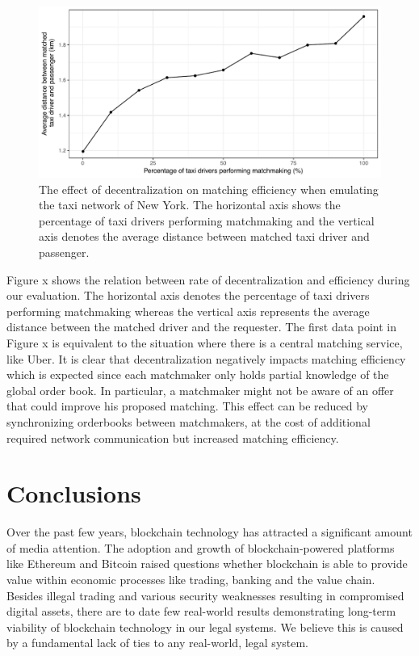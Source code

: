 \documentclass[USenglish]{article}
\begin{document}
\begin{figure}[t]
	\centering
	\includegraphics[width=0.8\columnwidth]{assets/matching_efficiency}
	\caption{The effect of decentralization on matching efficiency when emulating the taxi network of New York. The horizontal axis shows the percentage of taxi drivers performing matchmaking and the vertical axis denotes the average distance between matched taxi driver and passenger.}
	\label{fig:matching_efficiency}
\end{figure}

Figure x shows the relation between rate of decentralization and efficiency during our evaluation.
The horizontal axis denotes the percentage of taxi drivers performing matchmaking whereas the vertical axis represents the average distance between the matched driver and the requester.
The first data point in Figure x is equivalent to the situation where there is a central matching service, like Uber.
It is clear that decentralization negatively impacts matching efficiency which is expected since each matchmaker only holds partial knowledge of the global order book.
In particular, a matchmaker might not be aware of an offer that could improve his proposed matching.
This effect can be reduced by synchronizing orderbooks between matchmakers, at the cost of additional required network communication but increased matching efficiency.

\section{Conclusions}

Over the past few years, blockchain technology has attracted a significant amount of media attention.
The adoption and growth of blockchain-powered platforms like Ethereum and Bitcoin raised questions whether blockchain is able to provide value within economic processes like trading, banking and the value chain.
Besides illegal trading and various security weaknesses resulting in compromised digital assets, there are to date few real-world results demonstrating long-term viability of blockchain technology in our legal systems.
We believe this is caused by a fundamental lack of ties to any real-world, legal system.
\end{document}
